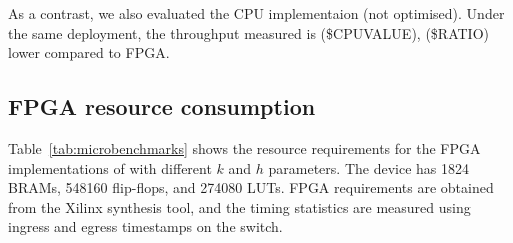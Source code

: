 As a contrast, we also evaluated the CPU implementaion (not optimised). Under the same deployment, the throughput measured is 
(\$CPUVALUE), (\$RATIO) lower compared to FPGA.
 


\subsection{FPGA resource consumption}
Table~\ref{tab:microbenchmarks} shows the resource requirements for the FPGA implementations of
\OurSys with different $k$ and $h$ parameters.  The device
has 1824 BRAMs, 548160 flip-flops, and 274080 LUTs.
FPGA requirements are obtained from the Xilinx synthesis tool, and the
timing statistics are measured using ingress and egress timestamps on
the switch.

